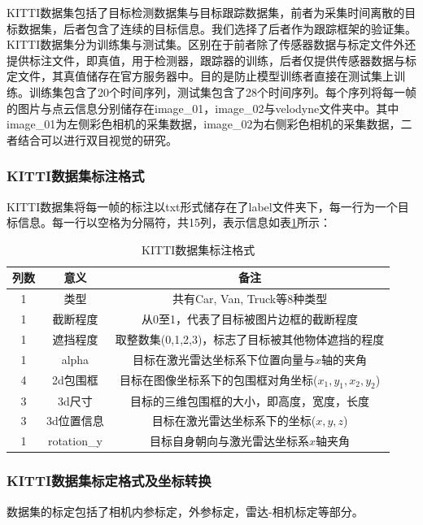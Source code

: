 KITTI数据集包括了目标检测数据集与目标跟踪数据集，前者为采集时间离散的目标数据集，后者包含了连续的目标信息。我们选择了后者作为跟踪框架的验证集。KITTI数据集分为训练集与测试集。区别在于前者除了传感器数据与标定文件外还提供标注文件，即真值，用于检测器，跟踪器的训练，后者仅提供传感器数据与标定文件，其真值储存在官方服务器中。目的是防止模型训练者直接在测试集上训练。训练集包含了20个时间序列，测试集包含了28个时间序列。每个序列将每一帧的图片与点云信息分别储存在image\_01，image\_02与velodyne文件夹中。其中image\_01为左侧彩色相机的采集数据，image\_02为右侧彩色相机的采集数据，二者结合可以进行双目视觉的研究。

\subsubsection{KITTI数据集标注格式}

KITTI数据集将每一帧的标注以txt形式储存在了label文件夹下，每一行为一个目标信息。每一行以空格为分隔符，共15列，表示信息如表\ref{table2}所示：

\begin{table}[htbp]
    \centering
    \caption{KITTI数据集标注格式}
    \begin{tabular}{c c c}
    \toprule
    列数 & 意义 & 备注 \\
    \midrule
    1 & 类型 & 共有Car, Van, Truck等8种类型\\
    1 & 截断程度 & 从0至1，代表了目标被图片边框的截断程度\\
    1 & 遮挡程度 & 取整数集(0,1,2,3)，标志了目标被其他物体遮挡的程度\\
    1 & alpha & 目标在激光雷达坐标系下位置向量与$x$轴的夹角\\
    4 & 2d包围框 & 目标在图像坐标系下的包围框对角坐标($x_1, y_1, x_2, y_2$)\\
    3 & 3d尺寸 & 目标的三维包围框的大小，即高度，宽度，长度\\
    3 & 3d位置信息 & 目标在激光雷达坐标系下的坐标($x,y,z$)\\
    1 & rotation\_y & 目标自身朝向与激光雷达坐标系$x$轴夹角\\
    \bottomrule
    \end{tabular}
    \label{table2}
\end{table}

\subsubsection{KITTI数据集标定格式及坐标转换}

数据集的标定包括了相机内参标定，外参标定，雷达-相机标定等部分。

